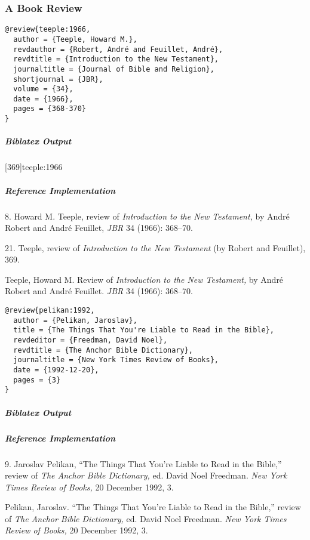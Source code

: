 \documentclass[a4paper]{article}
\newenvironment{biboutput}{%
  \subparagraph{Biblatex Output}
}{\color{black}}
\newenvironment{refimp}{%
  \subparagraph{Reference Implementation}
  \color{reference-colour}
  \rm
}{\par\color{black}}
\begin{document}
\subsubsection{A Book Review}

\begin{lstlisting}
@review{teeple:1966,
  author = {Teeple, Howard M.},
  revdauthor = {Robert, André and Feuillet, André},
  revdtitle = {Introduction to the New Testament},
  journaltitle = {Journal of Bible and Religion},
  shortjournal = {JBR},
  volume = {34},
  date = {1966},
  pages = {368-370}
}
\end{lstlisting}

\begin{biboutput}
  [369]{teeple:1966}
\end{biboutput}

\begin{refimp}
  \hspace*{\bibindent}8. Howard M. Teeple, review of \emph{Introduction to the
  New Testament,} by André Robert and André Feuillet, \emph{JBR} 34 (1966):
  368–70.
  
  \hspace*{\bibindent}21. Teeple, review of \emph{Introduction to the New
  Testament} (by Robert and Feuillet), 369.

  \hangindent\bibindent Teeple, Howard M. Review of \emph{Introduction to the
  New Testament,} by André Robert and André Feuillet. \emph{JBR} 34 (1966):
  368–70.

\end{refimp}

\begin{lstlisting}
@review{pelikan:1992,
  author = {Pelikan, Jaroslav},
  title = {The Things That You're Liable to Read in the Bible},
  revdeditor = {Freedman, David Noel},
  revdtitle = {The Anchor Bible Dictionary},
  journaltitle = {New York Times Review of Books},
  date = {1992-12-20},
  pages = {3}
}
\end{lstlisting}

\begin{biboutput}
\end{biboutput}

\begin{refimp}
  \hspace*{\bibindent}9. Jaroslav Pelikan, “The Things That You're Liable to
  Read in the Bible,” review of \emph{The Anchor Bible Dictionary,} ed.\@
  David Noel Freedman. \emph{New York Times Review of Books,} 20 December
  1992, 3.
  
  \hangindent\bibindent Pelikan, Jaroslav. “The Things That You're Liable to
  Read in the Bible,” review of \emph{The Anchor Bible Dictionary,} ed.\@
  David Noel Freedman. \emph{New York Times Review of Books,} 20 December
  1992, 3.
\end{refimp}
\end{document}
